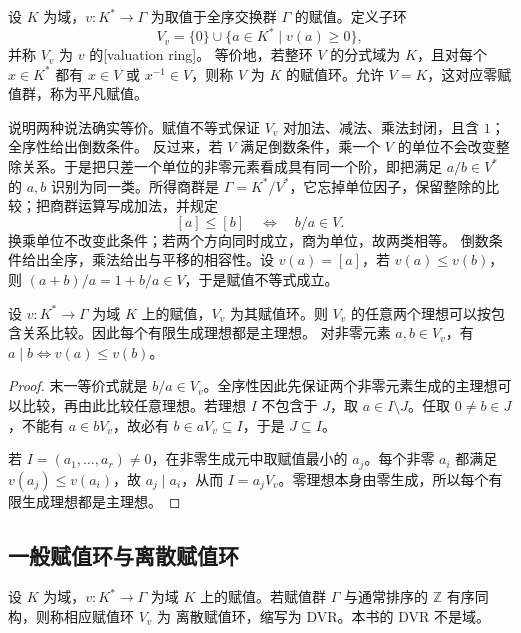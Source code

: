 \begin{definition}\label{b3:def:valuation-ring}
	设 \(K\) 为域，\(v:K^*\rightarrow\Gamma\) 为取值于全序交换群 \(\Gamma\) 的赋值。定义子环
	\[
		V_v=\{0\}\cup\bigl\{a\in K^*\mid v(a)\ge0\bigr\},
	\]
	并称 \(V_v\) 为 \(v\) 的[valuation ring]。 等价地，若整环 \(V\) 的分式域为 \(K\)，且对每个 \(x\in K^*\) 都有 \(x\in V\) 或 \(x^{-1}\in V\)，则称 \(V\) 为 \(K\) 的赋值环。允许 \(V=K\)，这对应零赋值群，称为平凡赋值。
\end{definition}

说明两种说法确实等价。赋值不等式保证 \(V_v\) 对加法、减法、乘法封闭，且含 \(1\)；全序性给出倒数条件。 反过来，若 \(V\) 满足倒数条件，乘一个 \(V\) 的单位不会改变整除关系。于是把只差一个单位的非零元素看成具有同一个阶，即把满足 \(a/b\in V^*\) 的 \(a,b\) 识别为同一类。所得商群是 \(\Gamma=K^*/V^*\)，它忘掉单位因子，保留整除的比较；把商群运算写成加法，并规定
\[
	[a]\le[b]\quad\Longleftrightarrow\quad b/a\in V.
\]
换乘单位不改变此条件；若两个方向同时成立，商为单位，故两类相等。 倒数条件给出全序，乘法给出与平移的相容性。设 \(v(a)=[a]\)，若 \(v(a)\le v(b)\)，则 \((a+b)/a=1+b/a\in V\)，于是赋值不等式成立。

\begin{proposition}\label{b3:prop:valuation-ideal-comparison}
	设 \(v:K^*\rightarrow\Gamma\) 为域 \(K\) 上的赋值，\(V_v\) 为其赋值环。则 \(V_v\) 的任意两个理想可以按包含关系比较。因此每个有限生成理想都是主理想。 对非零元素 \(a,b\in V_v\)，有 \(a\mid b\Longleftrightarrow v(a)\le v(b)\)。
\end{proposition}
\begin{proof}
	末一等价式就是 \(b/a\in V_v\)。全序性因此先保证两个非零元素生成的主理想可以比较，再由此比较任意理想。若理想 \(I\) 不包含于 \(J\)，取 \(a\in I\setminus J\)。任取 \(0\ne b\in J\)，不能有 \(a\in bV_v\)，故必有 \(b\in aV_v\subseteq I\)，于是 \(J\subseteq I\)。

	若 \(I=(a_1,\ldots,a_r)\ne0\)，在非零生成元中取赋值最小的 \(a_j\)。每个非零 \(a_i\) 都满足 \(v(a_j)\le v(a_i)\)，故 \(a_j\mid a_i\)，从而 \(I=a_jV_v\)。零理想本身由零生成，所以每个有限生成理想都是主理想。
\end{proof}

\subsection{一般赋值环与离散赋值环}
\label{b3:subsec:1001:02}

\begin{definition}\label{b3:def:discrete-valuation-ring}
	设 \(K\) 为域，\(v:K^*\rightarrow\Gamma\) 为域 \(K\) 上的赋值。若赋值群 \(\Gamma\) 与通常排序的 \(\mathbb Z\) 有序同构，则称相应赋值环 \(V_v\) 为 离散赋值环，缩写为 DVR。本书的 DVR 不是域。
\end{definition}

